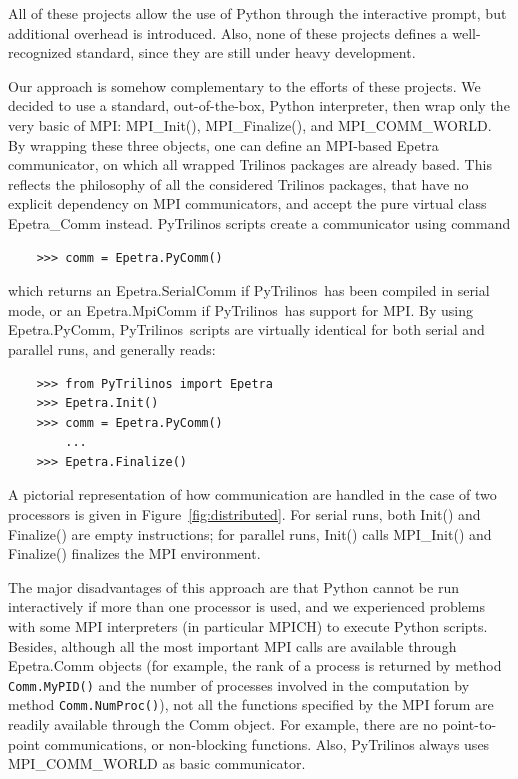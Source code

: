 \documentclass[acmtocl]{acmtrans2m}
\newcommand{\PyTrilinos}{{PyTrilinos}}
\begin{document}
All of these projects allow the use of Python through the
interactive prompt,
  but additional overhead is introduced. Also, none of these projects
  defines a well-recognized standard, since they are still under heavy
  development.

Our approach is somehow complementary to the efforts of these projects.
We decided to use a standard, out-of-the-box, Python interpreter, then wrap
only the very basic of MPI:
MPI\_Init(), MPI\_Finalize(), and MPI\_COMM\_WORLD. By wrapping these three
objects, one can define an MPI-based Epetra communicator, on which
all wrapped Trilinos packages are already
based. This reflects the philosophy of all the
considered
Trilinos packages, that have no explicit dependency on MPI communicators, and
accept the pure virtual class Epetra\_Comm instead. PyTrilinos scripts create
a communicator using command
\begin{verbatim}
    >>> comm = Epetra.PyComm()
\end{verbatim}
which returns an Epetra.SerialComm if \PyTrilinos\ has been compiled
in serial mode, or an Epetra.MpiComm if \PyTrilinos\ has support for
MPI. By using Epetra.PyComm, \PyTrilinos\ scripts are virtually
identical for both serial and parallel runs, and generally reads:
\begin{verbatim}
    >>> from PyTrilinos import Epetra
    >>> Epetra.Init()
    >>> comm = Epetra.PyComm()
        ...
    >>> Epetra.Finalize()
\end{verbatim}
A pictorial representation of how communication are handled in
the case of two  processors is given in Figure~\ref{fig:distributed}. For
serial runs, both Init() and Finalize() are empty instructions; for parallel
runs, Init() calls MPI\_Init() and Finalize() finalizes the MPI environment.

\smallskip

The major disadvantages of this approach are that Python cannot be run
interactively if more than one processor is used, and we experienced problems
with some MPI interpreters (in particular MPICH) to execute Python scripts.
Besides, although all the most important MPI calls are available through
Epetra.Comm objects (for example, the rank of a process is returned by method
                     {\tt Comm.MyPID()} and the number of processes involved in
                     the computation by method {\tt Comm.NumProc()}), not all
the functions specified by the MPI forum are readily available through the
Comm object.  For example, there are no point-to-point communications, or
non-blocking functions. Also, PyTrilinos always uses MPI\_COMM\_WORLD as basic
communicator.
\end{document}

